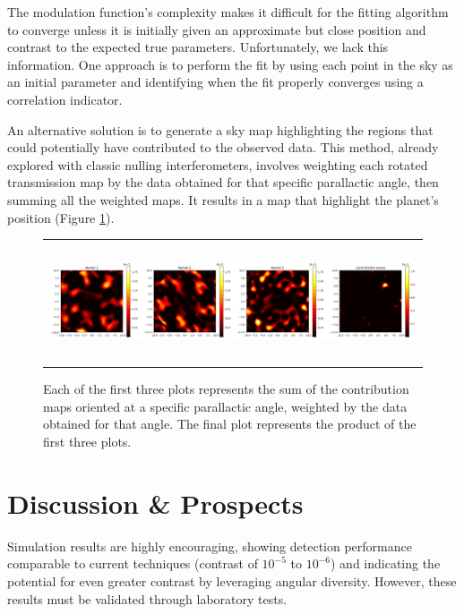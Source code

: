 \documentclass[]{spie}  %
\begin{document}
The modulation function's complexity makes it difficult for the fitting algorithm to converge unless it is initially given an approximate but close position and contrast to the expected true parameters. Unfortunately, we lack this information. One approach is to perform the fit by using each point in the sky as an initial parameter and identifying when the fit properly converges using a correlation indicator.

An alternative solution is to generate a sky map highlighting the regions that could potentially have contributed to the observed data. This method, already explored with classic nulling interferometers\cite{Image reconstruction}, involves weighting each rotated transmission map by the data obtained for that specific parallactic angle, then summing all the weighted maps. It results in a map that highlight the planet's position (Figure \ref{fig:contribution_zone}).

\begin{figure}[H]
    \begin{center}
    \begin{tabular}{c}
    \includegraphics[height=3.5cm]{img/contribution_zone.png}
    \end{tabular}
    \end{center}
    \caption[contribution_zone] 
    {\label{fig:contribution_zone} 
    Each of the first three plots represents the sum of the contribution maps oriented at a specific parallactic angle, weighted by the data obtained for that angle. The final plot represents the product of the first three plots.}
\end{figure}

\section{Discussion \& Prospects}

Simulation results are highly encouraging, showing detection performance comparable to current techniques (contrast of $10^{-5}$ to $10^{-6}$) and indicating the potential for even greater contrast by leveraging angular diversity. However, these results must be validated through laboratory tests.
\end{document}
